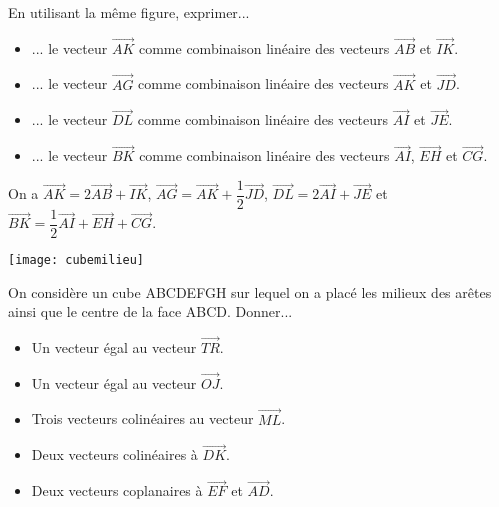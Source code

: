 \documentclass[11pt,fleqn, openany]{book} %
\begin{document}
\begin{exercise}
En utilisant la même figure, exprimer...
\begin{itemize}
\item ... le vecteur $\overrightarrow{AK}$ comme combinaison linéaire des vecteurs $\overrightarrow{AB}$ et $\overrightarrow{IK}$.
\item ... le vecteur $\overrightarrow{AG}$ comme combinaison linéaire des vecteurs $\overrightarrow{AK}$ et $\overrightarrow{JD}$.
\item ... le vecteur $\overrightarrow{DL}$ comme combinaison linéaire des vecteurs $\overrightarrow{AI}$ et $\overrightarrow{JE}$.
\item ... le vecteur $\overrightarrow{BK}$ comme combinaison linéaire des vecteurs $\overrightarrow{AI}$, $\overrightarrow{EH}$ et $\overrightarrow{CG}$.
\end{itemize}\end{exercise}

\begin{solution}On a $\overrightarrow{AK}=2\overrightarrow{AB}+\overrightarrow{IK}$, $\overrightarrow{AG}=\overrightarrow{AK}+\dfrac{1}{2}\overrightarrow{JD}$, $\overrightarrow{DL}=2\overrightarrow{AI}+\overrightarrow{JE}$ et $\overrightarrow{BK}=\dfrac{1}{2}\overrightarrow{AI}+\overrightarrow{EH}+\overrightarrow{CG}$.\end{solution}



\begin{exercise}
\vskip10pt

\begin{minipage}{0.3\linewidth}
 \begin{center}
\texttt{[image: cubemilieu]}
\end{center}
\end{minipage}\hfill\begin{minipage}{0.6\linewidth}
On considère un cube ABCDEFGH sur lequel on a placé les milieux des arêtes ainsi que le centre de la face ABCD. Donner...
\begin{itemize}
\item Un vecteur égal au vecteur $\overrightarrow{TR}$.
\item Un vecteur égal au vecteur $\overrightarrow{OJ}$.
\item Trois vecteurs colinéaires au vecteur $\overrightarrow{ML}$.
\item Deux vecteurs colinéaires à $\overrightarrow{DK}$.
\item Deux vecteurs coplanaires à $\overrightarrow{EF}$ et $\overrightarrow{AD}$.
\end{itemize}\end{minipage}
\vspace{-0.5cm}\end{exercise}
\end{document}
